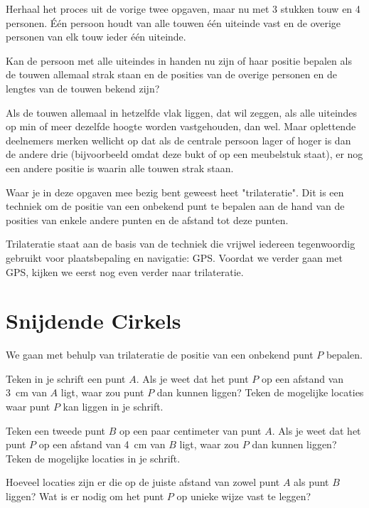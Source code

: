 \begin{opgave}
	Herhaal het proces uit de vorige twee opgaven, maar nu met 3 stukken touw en 4 personen. \'E\'en persoon houdt van alle touwen \'e\'en uiteinde vast en de overige personen van elk touw ieder \'e\'en uiteinde.

	Kan de persoon met alle uiteindes in handen nu zijn of haar positie bepalen als de touwen allemaal strak staan en de posities 	van de overige personen en de lengtes van de touwen bekend zijn?
	\begin{antwoord}
		Als de touwen allemaal in hetzelfde vlak liggen, dat wil zeggen, als alle uiteindes op min of meer dezelfde hoogte worden 	vastgehouden, dan wel. Maar oplettende deelnemers merken wellicht op dat als de centrale persoon lager of hoger is dan de 			andere drie (bijvoorbeeld omdat deze bukt of op een meubelstuk staat), er nog een andere positie is waarin alle touwen 				strak staan.
	\end{antwoord}
\end{opgave}

Waar je in deze opgaven mee bezig bent geweest heet "trilateratie". Dit is een techniek om de positie van een onbekend punt te bepalen aan de hand van de posities van enkele andere punten en de afstand tot deze punten.

Trilateratie staat aan de basis van de techniek die vrijwel iedereen tegenwoordig gebruikt voor plaatsbepaling en navigatie: GPS. Voordat we verder gaan met GPS, kijken we eerst nog even verder naar trilateratie.

\section{Snijdende Cirkels}

\begin{opgave}
	We gaan met behulp van trilateratie de positie van een onbekend punt $P$ bepalen.
\begin{subopgave}
		Teken in je schrift een punt $A$. Als je weet dat het punt $P$ op een afstand van 3~cm van $A$ ligt, waar zou punt $P$ dan kunnen liggen? Teken de mogelijke locaties waar punt $P$ kan liggen in je schrift.
\end{subopgave}
\begin{subopgave}
		Teken een tweede punt $B$ op een paar centimeter van punt $A$. Als je weet dat het punt $P$ op een afstand van 4~cm van $B$ ligt, waar zou $P$ dan kunnen liggen? Teken de mogelijke locaties in je schrift. 
\end{subopgave}
\begin{subopgave}
		Hoeveel locaties zijn er die op de juiste afstand van zowel punt $A$ als punt $B$ liggen? Wat is er nodig om het punt $P$ op unieke wijze vast te leggen?
\end{subopgave}
\end{opgave}

